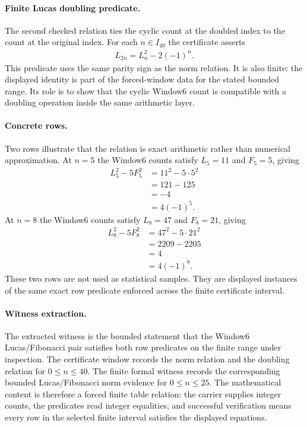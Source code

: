 \paragraph{Finite Lucas doubling predicate.}
The second checked relation ties the cyclic count at the doubled index to the count at the original index.  For each $n \in I_{40}$ the certificate asserts
$$
\begin{aligned}
L_{2n} = L_n^2 - 2(-1)^n.
\end{aligned}
$$
This predicate uses the same parity sign as the norm relation.  It is also finite: the displayed identity is part of the forced-window data for the stated bounded range.  Its role is to show that the cyclic Window6 count is compatible with a doubling operation inside the same arithmetic layer.

\paragraph{Concrete rows.}
Two rows illustrate that the relation is exact arithmetic rather than numerical approximation.  At $n=5$ the Window6 counts satisfy $L_5=11$ and $F_5=5$, giving
$$
\begin{aligned}
L_5^2 - 5F_5^2 &= 11^2 - 5\cdot 5^2\\
&= 121 - 125\\
&= -4\\
&= 4(-1)^5.
\end{aligned}
$$
At $n=8$ the Window6 counts satisfy $L_8=47$ and $F_8=21$, giving
$$
\begin{aligned}
L_8^2 - 5F_8^2 &= 47^2 - 5\cdot 21^2\\
&= 2209 - 2205\\
&= 4\\
&= 4(-1)^8.
\end{aligned}
$$
These two rows are not used as statistical samples.  They are displayed instances of the same exact row predicate enforced across the finite certificate interval.

\paragraph{Witness extraction.}
The extracted witness is the bounded statement that the Window6 Lucas/Fibonacci pair satisfies both row predicates on the finite range under inspection.  The certificate window records the norm relation and the doubling relation for $0 \leq n \leq 40$.  The finite formal witness records the corresponding bounded Lucas/Fibonacci norm evidence for $0 \leq n \leq 25$.  The mathematical content is therefore a forced finite table relation: the carrier supplies integer counts, the predicates read integer equalities, and successful verification means every row in the selected finite interval satisfies the displayed equations.

